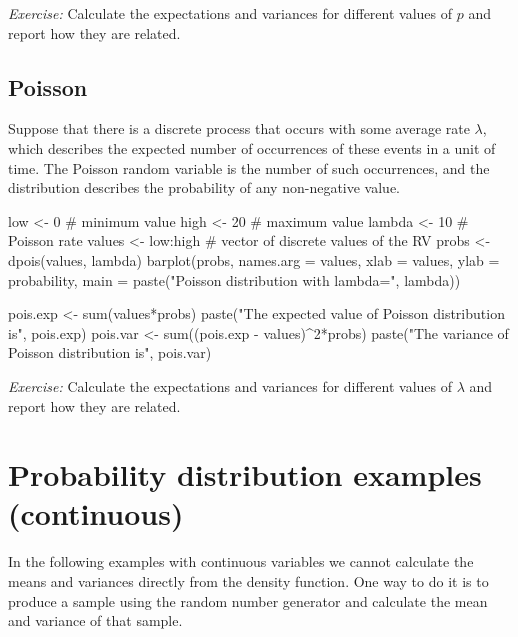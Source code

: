\documentclass[
  letterpaper,
  DIV=11,
  numbers=noendperiod]{scrreprt}
\newenvironment{Shaded}{\begin{snugshade}}{\end{snugshade}}
\newcommand{\NormalTok}[1]{\textcolor[rgb]{0.00,0.23,0.31}{#1}}
\begin{document}
\emph{Exercise:} Calculate the expectations and variances for different
values of \(p\) and report how they are related.

\subsection{Poisson}\label{poisson}

Suppose that there is a discrete process that occurs with some average
rate \(\lambda\), which describes the expected number of occurrences of
these events in a unit of time. The Poisson random variable is the
number of such occurrences, and the distribution describes the
probability of any non-negative value.

\begin{Shaded}
\begin{Highlighting}[]
\NormalTok{low \textless{}{-} 0 \# minimum value}
\NormalTok{high \textless{}{-} 20 \# maximum value}
\NormalTok{lambda \textless{}{-} 10 \# Poisson rate}
\NormalTok{values \textless{}{-} low:high \# vector of discrete values of the RV}
\NormalTok{probs \textless{}{-} dpois(values, lambda)}
\NormalTok{barplot(probs, names.arg = values, xlab = \textquotesingle{}values\textquotesingle{}, ylab = \textquotesingle{}probability\textquotesingle{},}
\NormalTok{        main = paste("Poisson distribution with lambda=", lambda))}
\end{Highlighting}
\end{Shaded}

\begin{Shaded}
\begin{Highlighting}[]
\NormalTok{pois.exp \textless{}{-} sum(values*probs)}
\NormalTok{paste("The expected value of Poisson distribution is", pois.exp)}
\NormalTok{pois.var \textless{}{-} sum((pois.exp {-} values)\^{}2*probs)}
\NormalTok{paste("The variance of Poisson distribution is", pois.var)}
\end{Highlighting}
\end{Shaded}

\emph{Exercise:} Calculate the expectations and variances for different
values of \(\lambda\) and report how they are related.

\section{Probability distribution examples
(continuous)}\label{probability-distribution-examples-continuous}

In the following examples with continuous variables we cannot calculate
the means and variances directly from the density function. One way to
do it is to produce a sample using the random number generator and
calculate the mean and variance of that sample.
\end{document}
